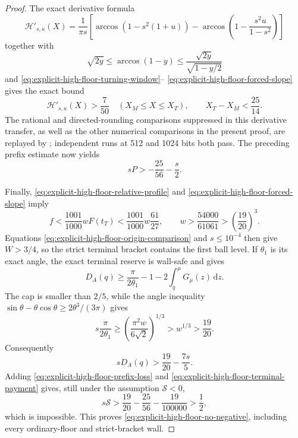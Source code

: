 \documentclass[11pt]{article}
\theoremstyle{remark}
\newcommand{\dd}{\,\mathrm d}
\begin{document}
\begin{proof}
The exact derivative formula
\[
 \mathcal H'_{s,\kappa}(X)=\frac1{\pi s}
 \left[\arccos(1-s^2(1+u))-
 \arccos\left(1-\frac{s^2u}{1-s^2}\right)\right]
\]
together with
\[
 \sqrt{2y}\leq\arccos(1-y)
 \leq\frac{\sqrt{2y}}{\sqrt{1-y/2}}
\]
and \eqref{eq:explicit-high-floor-turning-window}--
\eqref{eq:explicit-high-floor-forced-slope} gives the exact bound
\begin{equation}
 \mathcal H'_{s,\kappa}(X)>\frac7{50}
 \quad(X_M\leq X\leq X_T),\qquad
 X_T-X_M<\frac{25}{14}.
 \label{eq:explicit-high-floor-band-width}
\end{equation}
The rational and directed-rounding comparisons suppressed in this
derivative transfer, as well as the other numerical comparisons in the
present proof, are replayed by
; independent runs at
512 and 1024 bits both pass.
The preceding prefix estimate now yields
\begin{equation}
 sP> -\frac{25}{56}-\frac s2.
 \label{eq:explicit-high-floor-prefix-loss}
\end{equation}

Finally, \eqref{eq:explicit-high-floor-relative-profile} and
\eqref{eq:explicit-high-floor-forced-slope} imply
\[
 f<\frac{1001}{1000}wF(t_T)
 <\frac{1001}{1000}w\frac{61}{27},\qquad
 w>\frac{54000}{61061}>\left(\frac{19}{20}\right)^3.
\]
Equations \eqref{eq:explicit-high-floor-origin-comparison} and $s\leq10^{-4}$
then give $W>3/4$, so the strict terminal bracket contains the first ball
level.  If $\theta_1$ is its exact angle, the exact terminal reserve is
wall-safe and gives
\[
 D_A(q)\geq\frac\pi{2\theta_1}-1
 -2\int_q^\mu G_\mu(z)\dd z.
\]
The cap is smaller than $2/5$, while the angle inequality
$\sin\theta-\theta\cos\theta\geq2\theta^3/(3\pi)$ gives
\[
 s\frac\pi{2\theta_1}
 \geq\left(\frac{\pi^2w}{6\sqrt2}\right)^{1/3}
 >w^{1/3}>\frac{19}{20}.
\]
Consequently
\begin{equation}
 sD_A(q)>\frac{19}{20}-\frac{7s}{5}.
 \label{eq:explicit-high-floor-terminal-payment}
\end{equation}
Adding \eqref{eq:explicit-high-floor-prefix-loss} and
\eqref{eq:explicit-high-floor-terminal-payment} gives, still under the
assumption $\mathcal S<0$,
\[
 s\mathcal S>
 \frac{19}{20}-\frac{25}{56}-\frac{19}{100000}>\frac12,
\]
which is impossible.  This proves
\eqref{eq:explicit-high-floor-no-negative}, including every ordinary-floor
and strict-bracket wall.


\end{proof}
\end{document}
